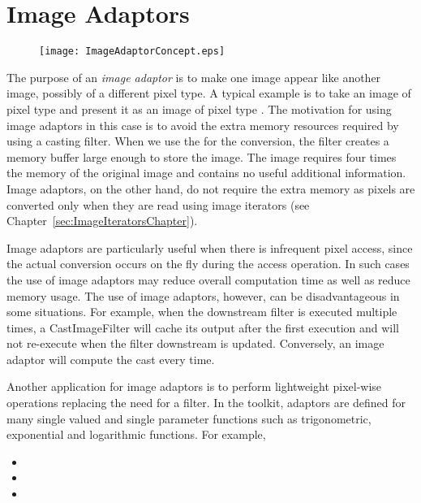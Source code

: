 
\chapter{Image Adaptors}
\label{sec:ImageAdaptors}


\begin{figure}
\centering
\texttt{[image: ImageAdaptorConcept.eps]}
\label{fig:ImageAdaptorConcept}
\end{figure}

The purpose of an \emph{image adaptor} is to make one image appear
like another image, possibly of a different pixel type.  A typical
example is to take an image of pixel type  and
present it as an image of pixel type . The motivation for
using image adaptors in this case is to avoid the extra memory
resources required by using a casting filter.  When we use the
 for the conversion, the filter creates a
memory buffer large enough to store the  image. The
 image requires four times the memory of the
original image and contains no useful additional information. Image
adaptors, on the other hand, do not require the extra memory as
pixels are converted only when they are read using image iterators
(see Chapter~\ref{sec:ImageIteratorsChapter}).

Image adaptors are particularly useful when there is infrequent pixel access,
since the actual conversion occurs on the fly during the access operation. In
such cases the use of image adaptors may reduce overall computation time as
well as reduce memory usage. The use of image adaptors, however, can be
disadvantageous in some situations. For example, when the downstream filter
is executed multiple times, a CastImageFilter will cache its output after the
first execution and will not re-execute when the filter downstream is
updated. Conversely, an image adaptor will compute the cast every time.

Another application for image adaptors is to perform lightweight
pixel-wise operations replacing the need for a filter. In the toolkit,
adaptors are defined for many single valued and single parameter
functions such as trigonometric, exponential and logarithmic
functions. For example,
\begin{itemize}
\item {}
\item {}
\item {}
\end{itemize}

